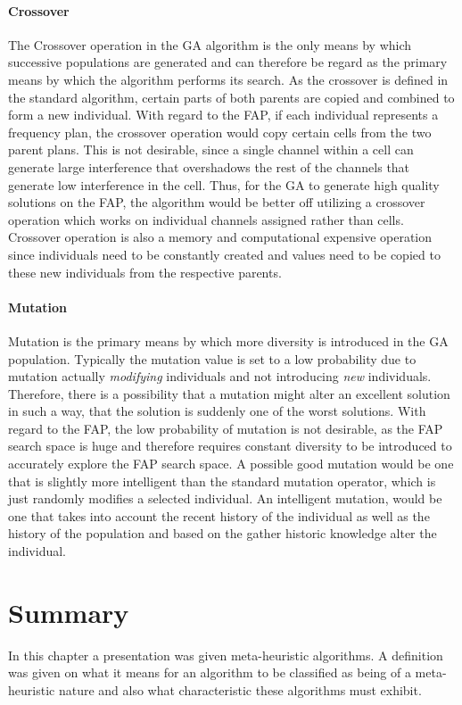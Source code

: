 \paragraph{Crossover}
The Crossover operation in the GA algorithm is the only means by which successive populations are generated and can therefore be regard as the primary means by which the algorithm performs its search. As the crossover is defined in the standard algorithm, certain parts of both parents are copied and combined to form a new individual. With regard to the FAP, if each individual represents a frequency plan, the crossover operation would copy certain cells from the two parent plans. This is not desirable, since a single channel within a cell can generate large interference that overshadows the rest of the channels that generate low interference in the cell. Thus, for the GA to generate high quality solutions on the FAP, the algorithm would be better off utilizing a crossover operation which works on individual channels assigned rather than cells. Crossover operation is also a memory and computational expensive operation since individuals need to be constantly created and values need to be copied to these new individuals from the respective parents.
\paragraph{Mutation}
Mutation is the primary means by which more diversity is introduced in the GA population. Typically the mutation value is set to a low probability due to mutation actually \emph{modifying} individuals and not introducing \emph{new} individuals. Therefore, there is a possibility that a mutation might alter an excellent solution in such a way, that the solution is suddenly one of the worst solutions. With regard to the FAP, the low probability of mutation is not desirable, as the FAP search space is huge and therefore requires constant diversity to be introduced to accurately explore the FAP search space. A possible good mutation would be one that is slightly more intelligent than the standard mutation operator, which is just randomly modifies a selected individual. An intelligent mutation, would be one that takes into account the recent history of the individual as well as the history of the population and based on the gather historic knowledge alter the individual.
\section {Summary}
In this chapter a presentation was given meta-heuristic algorithms. A definition was given on what it means for an algorithm to be classified as being of a meta-heuristic nature and also what characteristic these algorithms must exhibit.

